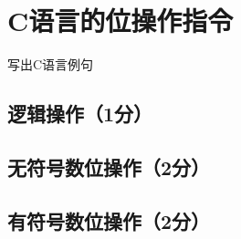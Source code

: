 \section{C语言的位操作指令}
\begin{center}
    写出C语言例句
\end{center}

\subsection{逻辑操作（1分）}

\subsection{无符号数位操作（2分）}

\subsection{有符号数位操作（2分）}

